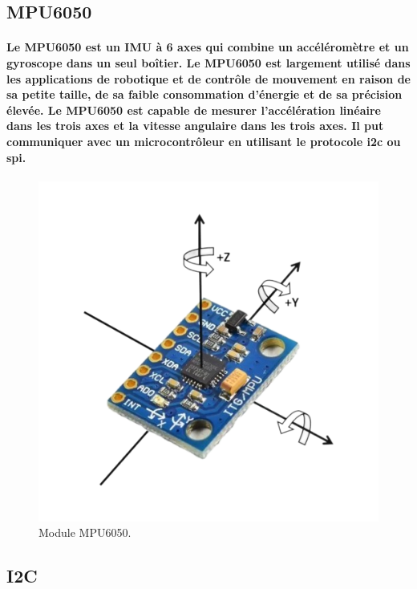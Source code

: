 \subsection{MPU6050}

\paragraph{Le MPU6050 est un IMU à 6 axes qui combine un accéléromètre et un gyroscope dans un seul boîtier. Le MPU6050 est largement utilisé dans les applications de robotique et de contrôle de mouvement en raison de sa petite taille, de sa faible consommation d'énergie et de sa précision élevée. Le MPU6050 est capable de mesurer l'accélération linéaire dans les trois axes et la vitesse angulaire dans les trois axes. Il put communiquer avec un microcontrôleur en utilisant le protocole \gls{i2c} ou \gls{spi}.}

\paragraph*{}
\begin{figure}[!htpb]
    \centering
    \includegraphics[width=0.8\linewidth]{Figures/mpu6050.png}
    \caption[Module MPU6050]{Module MPU6050.}
    \label{fig:mpu-6050}
\end{figure}


\subsection{I2C}


